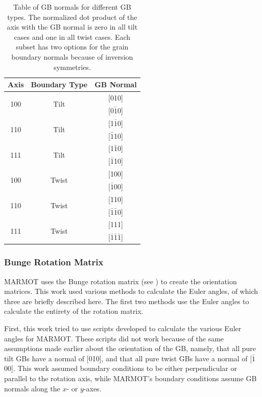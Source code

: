 \documentclass[twoside,senior]{BYUPhys}
\begin{document}
\begin{table}[ht!]
\centering
\caption{\label{table:geometricgbnorms}Table of GB normals for different GB types. The normalized dot product of the axis with the GB normal is zero in all tilt cases and one in all twist cases.  Each subset has two options for the grain boundary normals because of inversion symmetries.}

\begin{tabular}{ccc}
Axis & Boundary Type & GB Normal \\
\hline
\hline
\multirow{2}{*}{\textlangle{}100\textrangle{}} & \multirow{2}{*}{Tilt} & [010] \\
                              & & [0$\bar{1}$0] \\
\hline
\multirow{2}{*}{\textlangle{}110\textrangle{}} & \multirow{2}{*}{Tilt} & [1$\bar{1}$0] \\
							  & & [$\bar{1}$10] \\
\hline
\multirow{2}{*}{\textlangle{}111\textrangle{}} & \multirow{2}{*}{Tilt} & [1$\bar{1}$0] \\
							  & & [$\bar{1}$10] \\
\hline
\multirow{2}{*}{\textlangle{}100\textrangle{}} & \multirow{2}{*}{Twist} & [100] \\
							  & & [$\bar{1}$00] \\
\hline
\multirow{2}{*}{\textlangle{}110\textrangle{}} & \multirow{2}{*}{Twist} & [110] \\
							  & & [$\bar{1}\bar{1}$0] \\
\hline
\multirow{2}{*}{\textlangle{}111\textrangle{}} & \multirow{2}{*}{Twist} & [111] \\
							  & & [$\bar{1}\bar{1}\bar{1}$] \\
\hline
\hline
\end{tabular}
\end{table}

\subsubsection{Bunge Rotation Matrix\label{PQ:BungeMat}}
MARMOT uses the Bunge rotation matrix (see ) to create the orientation matrices.  This work used various methods to calculate the Euler angles, of which three are briefly described here. The first two methods use the Euler angles to calculate the entirety of the rotation matrix.

First, this work tried to use scripts developed to calculate the various Euler angles for MARMOT.  These scripts did not work because of the same assumptions made earlier about the orientation of the GB, namely, that all pure tilt GBs have a normal of [010], and that all pure twist GBs have a normal of [$\bar{1}$00].  This work assumed boundary conditions to be either perpendicular or parallel to the rotation axis, while MARMOT's boundary conditions assume GB normals along the $x$- or $y$-axes.
\end{document}
